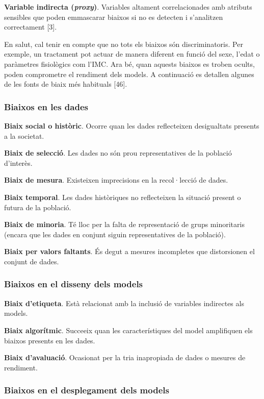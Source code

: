 \documentclass[CAT]{TFUOC}%
\begin{document}
\textbf{Variable indirecta (\emph{proxy})}. Variables altament correlacionades amb atributs sensibles que poden emmascarar biaixos si no es detecten i s'analitzen correctament {[}3{]}.

\bigskip

En salut, cal tenir en compte que no tots els biaixos són discriminatoris. Per exemple, un tractament pot actuar de manera diferent en funció del sexe, l'edat o paràmetres fisiològics com l'IMC. Ara bé, quan aquests biaixos es troben ocults, poden comprometre el rendiment dels models. A continuació es detallen algunes de les fonts de biaix més habituals {[}46{]}.

\subsubsection{Biaixos en les dades}\label{biaixos-en-les-dades}

\textbf{Biaix social o històric}. Ocorre quan les dades reflecteixen desigualtats presents a la societat.

\textbf{Biaix de selecció}. Les dades no són prou representatives de la població d'interès.

\textbf{Biaix de mesura}. Existeixen imprecisions en la recol·lecció de dades.

\textbf{Biaix temporal}. Les dades històriques no reflecteixen la situació present o futura de la població.

\textbf{Biaix de minoria}. Té lloc per la falta de representació de grups minoritaris (encara que les dades en conjunt siguin representatives de la població).

\textbf{Biaix per valors faltants}. És degut a mesures incompletes que distorsionen el conjunt de dades.

\subsubsection{Biaixos en el disseny dels models}\label{biaixos-en-el-disseny-dels-models}

\textbf{Biaix d'etiqueta}. Està relacionat amb la inclusió de variables indirectes als models.

\textbf{Biaix algorítmic}. Succeeix quan les característiques del model amplifiquen els biaixos presents en les dades.

\textbf{Biaix d'avaluació}. Ocasionat per la tria inapropiada de dades o mesures de rendiment.

\subsubsection{Biaixos en el desplegament dels models}\label{biaixos-en-el-desplegament-dels-models}
\end{document}
